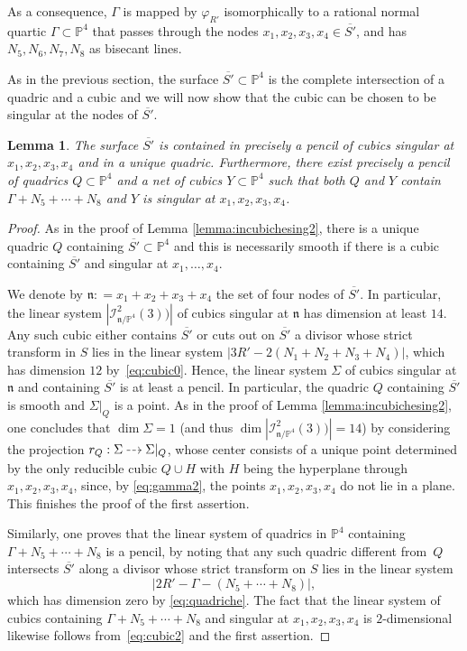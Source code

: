 \documentclass[JEP,XML,SOM,Unicode,NoEqCountersInSection,published]{cedram}
\newcommand{\dradpl}{{\hspace*{-2.5mm}\begin{tikzcd}[ampersand replacement=\&,column sep = scriptsize]\mbox{}\ar[r,dashed]\&\mbox{}\end{tikzcd}\hspace*{-2.5mm}}}
\newcommand{\dratst}{{\hspace*{-2mm}\begin{tikzcd}[ampersand replacement=\&,column sep = small]\mbox{}\ar[r,dashed]\&\mbox{}\end{tikzcd}\hspace*{-2mm}}}
\let\drascst\dratst
\newcommand{\dra}{\mathchoice{\dradpl}{\dratst}{\drascst}{\drascst}}
\theoremstyle{plain}
\newtheorem{lemma}[thm]{Lemma}
\theoremstyle{definition}
\newcommand\PP{{\mathbb P}}
\newcommand\I{{\mathcal I}}
\begin{document}
As a consequence, $\Gamma$ is mapped by $\varphi_{R'}$ isomorphically to a rational normal quartic $\Gamma\subset \PP^4$ that passes through the nodes $x_1,x_2,x_3,x_4\in \overline{S'}$, and has $N_5,N_6,N_7,N_8$ as bisecant lines.

As in the previous section, the surface $\overline{S'}\subset \PP^4$ is the complete intersection of a quadric and a cubic and we will now show that the cubic can be chosen to be singular at the nodes of $\overline{S'}$.

\begin{lemma} \label{lemma:incubichesing}
The surface $\overline{S'}$ is contained in precisely a pencil of cubics singular at $x_1,x_2,x_3,x_4$ and in a unique quadric. Furthermore, there exist precisely a pencil of quadrics $Q \subset\mathbb P^4$ and a net of cubics $Y\subset\mathbb P^4$ such that both $Q$ and $Y$ contain $\Gamma+N_5+\cdots+N_8$ and $Y$ is singular at $x_1,x_2,x_3,x_4$.
\end{lemma}

\begin{proof}
As in the proof of Lemma \ref{lemma:incubichesing2}, there is a unique quadric $Q$ containing $\overline{S'}\subset \mathbb P^4$ and this is necessarily smooth if there is a cubic containing $\overline{S'}$ and singular at $x_1,\ldots,x_4$.\enlargethispage{.5\baselineskip}%

We denote by $\mathfrak{n}: = x_1 + x_2 + x_3 + x_4$ the set of four nodes of $\overline{S'}$. In particular, the linear system $|\I^2_{\mathfrak{n}/\PP^4}(3))|$ of cubics singular at $\mathfrak n$ has dimension at least $14$. Any such cubic either contains $\overline{S'}$ or cuts out on $\overline{S'}$ a divisor whose strict transform in $S$ lies in the linear system $|3R'-2(N_1+N_2+N_3+N_4)|$, which has dimension $12$ by~\eqref{eq:cubic0}. Hence, the linear system $\Sigma$ of cubics singular at $\mathfrak n$ and containing $\overline{S'}$ is at least a pencil. In particular, the quadric $Q$ containing $\overline{S'}$ is smooth and $\Sigma|_Q$ is a point. As in the proof of Lemma \ref{lemma:incubichesing2}, one concludes that $\dim \Sigma=1$ (and thus $\dim |\I^2_{\mathfrak{n}/\PP^4}(3))|=14$) by considering the projection $r_Q:\Sigma \dra \Sigma|_Q$, whose center consists of a unique point determined by the only reducible cubic $Q \cup H$ with $H$ being the hyperplane through $x_1,x_2,x_3,x_4$, since, by \eqref{eq:gamma2}, the points $x_1,x_2,x_3,x_4$ do not lie in a plane. This finishes the proof of the first assertion.

Similarly, one proves that the linear system of quadrics in $\PP^4$ containing $\Gamma+N_5+\cdots+N_8$ is a pencil, by noting that any such quadric different from~$Q$ intersects $\overline{S'}$ along a divisor whose strict transform on $S$ lies in the linear system\vspace*{-3pt}\enlargethispage{.5\baselineskip}
\[
|2R'-\Gamma-(N_5+\cdots+N_8)|,
\]
which has dimension zero by \eqref{eq:quadriche}. The fact that the linear system of cubics containing $\Gamma+N_5+\cdots+N_8$ and singular at $x_1,x_2,x_3,x_4$ is $2$-dimensional
likewise follows from~\eqref{eq:cubic2} and the first assertion.
\end{proof}
\end{document}

